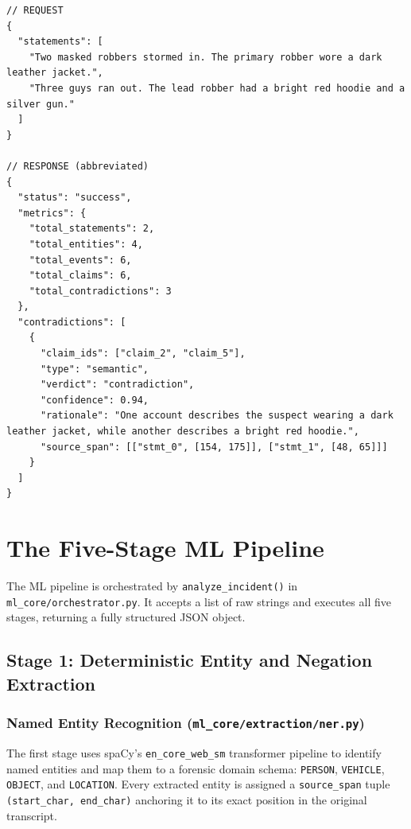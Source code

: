 \documentclass[12pt,a4paper]{report}
\begin{document}
\begin{lstlisting}[style=jsonstyle, caption={Example POST /analyze request body and abbreviated response.}]
// REQUEST
{
  "statements": [
    "Two masked robbers stormed in. The primary robber wore a dark leather jacket.",
    "Three guys ran out. The lead robber had a bright red hoodie and a silver gun."
  ]
}

// RESPONSE (abbreviated)
{
  "status": "success",
  "metrics": {
    "total_statements": 2,
    "total_entities": 4,
    "total_events": 6,
    "total_claims": 6,
    "total_contradictions": 3
  },
  "contradictions": [
    {
      "claim_ids": ["claim_2", "claim_5"],
      "type": "semantic",
      "verdict": "contradiction",
      "confidence": 0.94,
      "rationale": "One account describes the suspect wearing a dark leather jacket, while another describes a bright red hoodie.",
      "source_span": [["stmt_0", [154, 175]], ["stmt_1", [48, 65]]]
    }
  ]
}
\end{lstlisting}

\chapter{The Five-Stage ML Pipeline}

The ML pipeline is orchestrated by \texttt{analyze\_incident()} in \texttt{ml\_core/orchestrator.py}. It accepts a list of raw strings and executes all five stages, returning a fully structured JSON object.

\section{Stage 1: Deterministic Entity and Negation Extraction}

\subsection{Named Entity Recognition (\texttt{ml\_core/extraction/ner.py})}

The first stage uses spaCy's \texttt{en\_core\_web\_sm} transformer pipeline to identify named entities and map them to a forensic domain schema: \texttt{PERSON}, \texttt{VEHICLE}, \texttt{OBJECT}, and \texttt{LOCATION}. Every extracted entity is assigned a \texttt{source\_span} tuple \texttt{(start\_char, end\_char)} anchoring it to its exact position in the original transcript.
\end{document}
